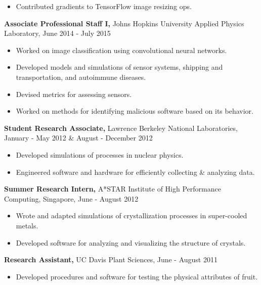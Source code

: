 \documentclass[margin]{res}
\begin{document}
\begin{resume}
\begin{itemize}
  \item Contributed gradients to TensorFlow image resizing ops.
\end{itemize}\vspace{-8pt}
{\bf Associate Professional Staff I,} Johns Hopkins University Applied Physics Laboratory, June 2014 - July 2015 
\begin{itemize} \itemsep -2pt
 \item Worked on image classification using convolutional neural networks. \item Developed models and simulations of sensor systems, shipping and transportation, and autoimmune diseases. \item Devised metrics for assessing sensors. \item Worked on methods for identifying malicious software based on its behavior. \end{itemize}\vspace{-8pt}
 {\bf Student Research Associate,} Lawrence Berkeley National Laboratories, January - May 2012 \& August - December 2012
\begin{itemize} \itemsep -2pt
  \item Developed simulations of processes in nuclear physics. \item Engineered software and hardware for efficiently collecting \& analyzing data. \end{itemize}\vspace{-8pt}
{\bf Summer Research Intern,} A*STAR Institute of High Performance Computing, Singapore, June - August 2012
\begin{itemize} \itemsep -2pt
  \item Wrote and adapted simulations of crystallization processes in super-cooled metals. \item Developed software for analyzing and visualizing the structure of crystals. \end{itemize}\vspace{-8pt}
{\bf Research Assistant,} UC Davis Plant Sciences, June - August 2011
 \begin{itemize} \itemsep -2pt
  \item Developed procedures and software for testing the physical attributes of fruit. \end{itemize}


\end{resume}
\end{document}
